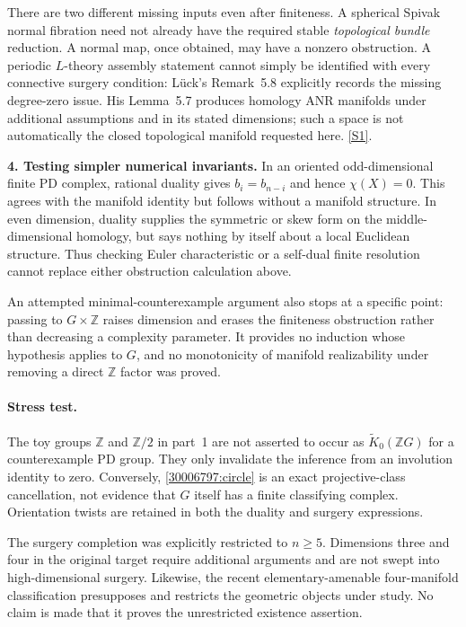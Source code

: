 \documentclass[11pt,a4paper]{article}
\newcommand{\Z}{\mathbb{Z}}
\newcommand{\sref}[2]{\hyperlink{source:#1:#2}{[S#2]}}
\numberwithin{equation}{section}
\begin{document}
There are two different missing inputs even after finiteness. A spherical
Spivak normal fibration need not already have the required stable
\emph{topological bundle} reduction. A normal map, once obtained, may
have a nonzero obstruction. A periodic $L$-theory assembly statement
cannot simply be identified with every connective surgery condition:
L\"uck's Remark~5.8 explicitly records the missing degree-zero issue.
His Lemma~5.7 produces homology ANR manifolds under additional assumptions
and in its stated dimensions; such a space is not automatically the
closed topological manifold requested here. \sref{30006797}{1}.

\textbf{4. Testing simpler numerical invariants.}
In an oriented odd-dimensional finite PD complex, rational duality gives
$b_i=b_{n-i}$ and hence $\chi(X)=0$. This agrees with the manifold
identity but follows without a manifold structure. In even dimension,
duality supplies the symmetric or skew form on the middle-dimensional
homology, but says nothing by itself about a local Euclidean structure.
Thus checking Euler characteristic or a self-dual finite resolution
cannot replace either obstruction calculation above.

An attempted minimal-counterexample argument also stops at a specific
point: passing to $G\times\Z$ raises dimension and erases the finiteness
obstruction rather than decreasing a complexity parameter. It provides
no induction whose hypothesis applies to $G$, and no monotonicity of
manifold realizability under removing a direct $\Z$ factor was proved.

\paragraph{Stress test.}
The toy groups $\Z$ and $\Z/2$ in part~1 are not asserted to occur as
$\widetilde K_0(\Z G)$ for a counterexample PD group. They only invalidate
the inference from an involution identity to zero. Conversely,
\eqref{30006797:circle} is an exact projective-class cancellation, not evidence
that $G$ itself has a finite classifying complex. Orientation twists are
retained in both the duality and surgery expressions.

The surgery completion was explicitly restricted to $n\ge5$.
Dimensions three and four in the original target require additional
arguments and are not swept into high-dimensional surgery. Likewise,
the recent elementary-amenable four-manifold classification presupposes
and restricts the geometric objects under study. No claim is made that
it proves the unrestricted existence assertion.
\end{document}
